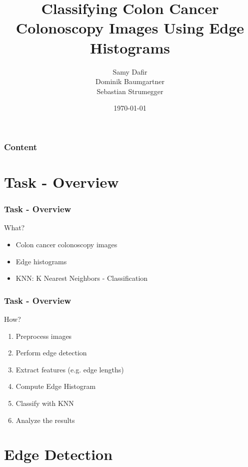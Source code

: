 \documentclass{beamer}
\title{Classifying Colon Cancer Colonoscopy Images Using Edge Histograms}
\author[]{Samy Dafir \\Dominik Baumgartner \\Sebastian Strumegger}
\date{\today}
\begin{document}
\frame{\titlepage}

\begin{frame}
    \frametitle{Content} 
    \tableofcontents 
\end{frame}

\section{Task - Overview}
\begin{frame}
	\frametitle{Task - Overview}
    \begin{block}{What?}
	    \begin{itemize}
		    \item Colon cancer colonoscopy images
		    \item Edge histograms
            \item KNN: K Nearest Neighbors - Classification
	    \end{itemize}
    \end{block}
\end{frame}

\begin{frame}
	\frametitle{Task - Overview}
    \begin{block}{How?}
	    \begin{enumerate}
		    \item Preprocess images
		    \item Perform edge detection
		    \item Extract features (e.g. edge lengths)
            \item Compute Edge Histogram
            \item Classify with KNN
            \item Analyze the results
	    \end{enumerate}
    \end{block}
\end{frame}

\section{Edge Detection}
\end{document}
